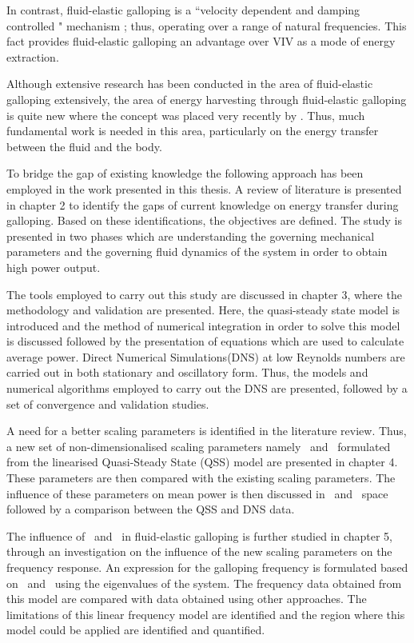 In contrast, fluid-elastic galloping is a ``velocity dependent and damping controlled " mechanism \citep{Paidoussis2010}; thus, operating over a range of natural frequencies. This fact provides fluid-elastic galloping an advantage over VIV as a mode of energy extraction. 

Although extensive research has been conducted in the area of fluid-elastic galloping extensively, the area of energy harvesting through fluid-elastic galloping is quite new where the concept was placed very recently by \citet{Barrero-Gil2010a}. Thus, much fundamental work is needed in this area, particularly on the energy transfer between the fluid and the body.   
 
To bridge the gap of existing knowledge the following approach has been employed in the work presented in this thesis. A review of literature is presented in chapter 2 to identify the gaps of current knowledge on energy transfer during galloping. Based on these identifications, the objectives are defined. The study is presented in two phases which are understanding the governing mechanical parameters and the governing fluid dynamics of the system in order to obtain high power output.  

The tools employed to carry out this study are discussed in chapter 3, where the methodology and validation are presented. Here, the quasi-steady state model is introduced and the method of numerical integration in order to solve this model is discussed followed by the presentation of equations which are used to calculate average power. Direct Numerical Simulations(DNS) at low Reynolds numbers are carried out in both stationary and  oscillatory form. Thus, the models and numerical algorithms employed to carry out the DNS are presented, followed by a set of convergence and validation studies.  

A need for a better scaling parameters is identified in the literature review. Thus, a new set of non-dimensionalised scaling parameters namely \massstiff\ and \massdamp\ formulated from the linearised Quasi-Steady State (QSS) model are presented in chapter 4. These parameters are then compared with the existing scaling parameters. The influence of these parameters on mean power is then discussed in \massstiff\ and \massdamp\ space followed by a comparison between the QSS and DNS data.

The influence of \massstiff\ and \massdamp\ in fluid-elastic galloping is further studied in chapter 5, through an investigation on the influence of the new scaling parameters on the frequency response. An expression for the galloping frequency is formulated based on \massstiff\ and \massdamp\ using the eigenvalues of the system. The frequency data obtained from this model are compared with data obtained using other approaches. The limitations of this linear frequency model are identified and the region where this model could be applied are identified and quantified.

